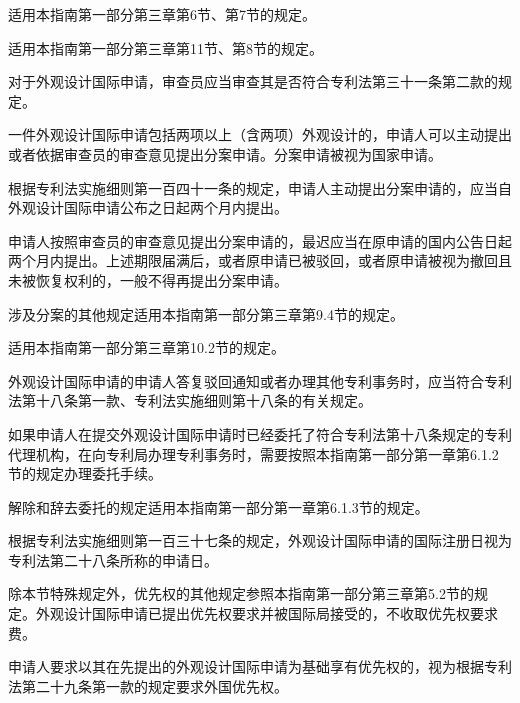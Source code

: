适用本指南第一部分第三章第6节、第7节的规定。

适用本指南第一部分第三章第11节、第8节的规定。

对于外观设计国际申请，审查员应当审查其是否符合专利法第三十一条第二款的规定。

一件外观设计国际申请包括两项以上（含两项）外观设计的，申请人可以主动提出或者依据审查员的审查意见提出分案申请。分案申请被视为国家申请。

根据专利法实施细则第一百四十一条的规定，申请人主动提出分案申请的，应当自外观设计国际申请公布之日起两个月内提出。

申请人按照审查员的审查意见提出分案申请的，最迟应当在原申请的国内公告日起两个月内提出。上述期限届满后，或者原申请已被驳回，或者原申请被视为撤回且未被恢复权利的，一般不得再提出分案申请。

涉及分案的其他规定适用本指南第一部分第三章第9.4节的规定。

适用本指南第一部分第三章第10.2节的规定。

外观设计国际申请的申请人答复驳回通知或者办理其他专利事务时，应当符合专利法第十八条第一款、专利法实施细则第十八条的有关规定。

如果申请人在提交外观设计国际申请时已经委托了符合专利法第十八条规定的专利代理机构，在向专利局办理专利事务时，需要按照本指南第一部分第一章第6.1.2节的规定办理委托手续。

解除和辞去委托的规定适用本指南第一部分第一章第6.1.3节的规定。

根据专利法实施细则第一百三十七条的规定，外观设计国际申请的国际注册日视为专利法第二十八条所称的申请日。

除本节特殊规定外，优先权的其他规定参照本指南第一部分第三章第5.2节的规定。外观设计国际申请已提出优先权要求并被国际局接受的，不收取优先权要求费。

申请人要求以其在先提出的外观设计国际申请为基础享有优先权的，视为根据专利法第二十九条第一款的规定要求外国优先权。


